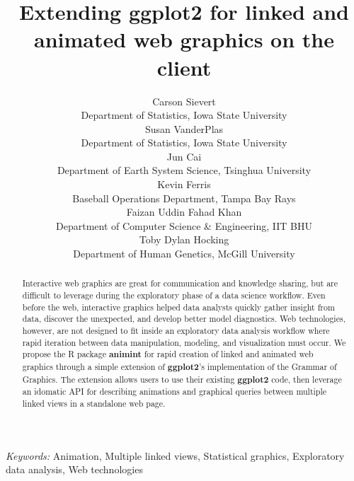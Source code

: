 \documentclass[12pt,]{article}
\theoremstyle{definition}
\theoremstyle{definition}
\theoremstyle{definition}
\theoremstyle{remark}
\begin{document}
\def\spacingset#1{\renewcommand{\baselinestretch}%
{#1}\small\normalsize} \spacingset{1}

\title{\bf Extending ggplot2 for linked and animated web graphics on the client}
\author{
  Carson Sievert \\ 
  Department of Statistics, Iowa State University \\
  Susan VanderPlas \\
  Department of Statistics, Iowa State University \\
  Jun Cai \\
  Department of Earth System Science, Tsinghua University\\
  Kevin Ferris \\
  Baseball Operations Department, Tampa Bay Rays \\
  Faizan Uddin Fahad Khan \\
  Department of Computer Science \& Engineering, IIT BHU \\
  Toby Dylan Hocking \\ 
  Department of Human Genetics, McGill University \\
}
\maketitle

\bigskip
\begin{abstract}
Interactive web graphics are great for communication and knowledge
sharing, but are difficult to leverage during the exploratory phase of a
data science workflow. Even before the web, interactive graphics helped
data analysts quickly gather insight from data, discover the unexpected,
and develop better model diagnostics. Web technologies, however, are not
designed to fit inside an exploratory data analysis workflow where rapid
iteration between data manipulation, modeling, and visualization must
occur. We propose the R package \textbf{animint} for rapid creation of
linked and animated web graphics through a simple extension of
\textbf{ggplot2}'s implementation of the Grammar of Graphics. The
extension allows users to use their existing \textbf{ggplot2} code, then
leverage an idomatic API for describing animations and graphical queries
between multiple linked views in a standalone web page.
\end{abstract}

\noindent
{\it Keywords:}  Animation, Multiple linked views, Statistical graphics, Exploratory data
analysis, Web technologies
\vfill
\end{document}
